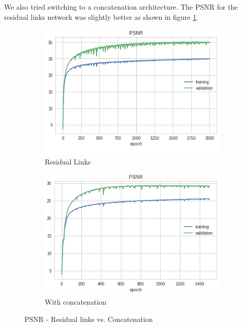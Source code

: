 \documentclass[12pt]{article}
\begin{document}
We also tried switching to a concatenation architecture. The PSNR for the residual links network was slightly better as shown in figure \ref{resnet vs densnet}.

\begin{figure}[h]
  \centering
  \begin{subfigure}[b]{0.4\linewidth}
    \includegraphics[width=\linewidth]{2dr.png}
    \caption{Residual Links}
  \end{subfigure}
  \begin{subfigure}[b]{0.4\linewidth}
    \includegraphics[width=\linewidth]{2ds_vanilla.png}
    \caption{With concatenation}
  \end{subfigure}
  \caption{PSNR - Residual links vs. Concatenation }
  \label{resnet vs densnet}
\end{figure}
\end{document}
